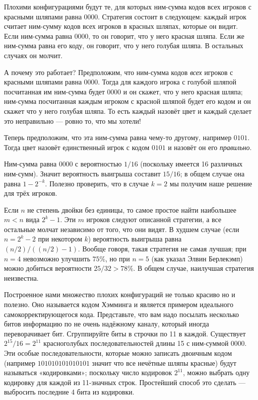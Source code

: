 Плохими конфигурациями будут те, для которых ним-сумма кодов всех игроков с красными шляпами равна $0000$.
Стратегия состоит в следующем: каждый игрок считает ним-сумму кодов всех игроков в красных шляпах, которые он видит.
Если ним-сумма равна $0000$, то он говорит, что у него красная шляпа.
Если же ним-сумма равна его коду, он говорит, что у него голубая шляпа.
В остальных случаях он молчит.

А почему это работает?
Предположим, что ним-сумма кодов \emph{всех} игроков с красными шляпами равна $0000$.
Тогда для каждого игрока с голубой шляпой посчитанная им ним-сумма будет $0000$ и он скажет, что у него красная шляпа;
ним-сумма посчитанная каждым игроком с красной шляпой будет его кодом и он скажет что у него голубая шляпа.
То есть каждый назовёт цвет и каждый сделает это неправильно --- ровно то, что мы хотели!

Теперь  предположим, что эта ним-сумма равна чему-то другому, например $0101$.
Тогда цвет назовёт единственный игрок с кодом  $0101$ и назовёт он его \emph{правильно}.

Ним-сумма равна $0000$ с вероятностью $1/16$ (поскольку имеется 16 различных ним-сумм).
Значит вероятность выигрыша составит $15/16$;
в общем случае она равна $1-2^{-k}$.
Полезно проверить, что в случае $k=2$ мы получим наше решение для трёх игроков.

Если $n$ не степень двойки без единицы, то самое простое найти наибольшее $m<n$ вида $2^k-1$.
Эти $m$ игроков следуют описанной стратегии, а все остальные молчат независимо от того, что они видят.
В худшем случае (если $n=2^k-2$ при некотором $k$) вероятность выигрыша равна $(n/2)/((n/2)-1)$.
Вообще говоря, такая стратегия не самая лучшая;
при $n=4$ невозможно улучшить $75\%$, но при $n=5$ (как указал Элвин Берлекэмп) можно добиться вероятности $25/32>78\%$.
В общем случае, наилучшая стратегия неизвестна.
\heart

Построенное нами множество плохих конфигураций не только красиво но и полезно.
Оно называется кодом Хэмминга и является примером идеального самокорректирующегося кода.
Представьте, что вам надо посылать несколько битов информацию по не очень надёжному каналу, который иногда переворачивает бит.
Сгруппируйте биты в строчки по 11 в каждой.
Существует $2^{15}/16=2^{11}$ красноголубых последовательностей длины 15 с ним-суммой $0000$.
Эти особые последовательности, которые можно записать двоичным кодом (например $101010101010101$ значит что все нечётные шляпы красные) будут называться «кодировками»; %
поскольку число кодировок $2^{11}$, можно выбрать одну кодировку для каждой из 11-значных строк.
Простейший способ это сделать --- выбросить последние 4 бита из кодировки.

